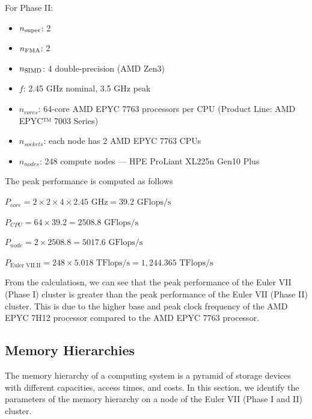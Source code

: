 \documentclass[unicode,11pt,a4paper,oneside,numbers=endperiod,openany]{scrartcl}
\begin{document}
For Phase II:
\begin{itemize}
    \item $n_{\tiny{\textrm{super}}}$: 2 \cite{uops-info}
    \item $n_{\tiny{\textrm{FMA}}}$: 2 \cite{uops-info}
    \item $n_{\tiny{\textrm{SIMD}}}$: 4 double-precision (AMD Zen3) \cite{hager2021amd}
    \item $f$: 2.45 GHz nominal, 3.5 GHz peak \cite{euler-ethz}
    \item $n_{cores}$: 64-core AMD EPYC 7763 processors per CPU (Product Line: AMD EPYC™ 7003 Series) 
        \cite{amd-epyc-7763}
    \item $n_{sockets}$: each node has 2 AMD EPYC 7763 CPUs \cite{euler-ethz}
    \item $n_{nodes}$: 248 compute nodes — HPE ProLiant XL225n Gen10 Plus \cite{euler-ethz}
\end{itemize}
The peak performance is computed as follows
\begin{center}
    $P_{core}  = 2 \times 2 \times 4 \times 2.45 \textrm{ GHz}= 39.2 \textrm{ GFlops/s}$
\end{center}
\begin{center}
    $P_{CPU} = 64 \times 39.2 = 2508.8 \textrm{ GFlops/s}$
\end{center}
\begin{center}
    $P_{node} = 2 \times 2508.8 = 5017.6 \textrm{ GFlops/s}$
\end{center}
\begin{center}
    $\boxed{P_{\textrm{Euler VII.II}} = 248 \times 5.018 \textrm{ TFlops/s}  = 1,244.365 \textrm{ TFlops/s}}$
\end{center}

From the calculatiosn, we can see that the peak performance of the Euler VII (Phase I) cluster is greater than
the peak performance of the Euler VII (Phase II) cluster. This is due to the higher base and peak clock frequency
of the AMD EPYC 7H12 processor compared to the AMD EPYC 7763 processor.

\subsection{Memory Hierarchies}
The memory hierarchy of a computing system is a pyramid of storage devices with different capacities,
access times, and costs. In this section, we identify the parameters of the memory hierarchy on a node
of the Euler VII (Phase I and II) cluster.
\end{document}
